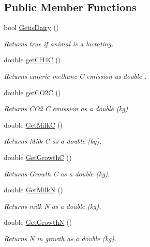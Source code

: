 \subsection*{Public Member Functions}
\begin{DoxyCompactItemize}
\item 
bool \mbox{\hyperlink{classlivestock_a1c4aab24ce56140e9c81ea03037c7f61}{Getis\+Dairy}} ()
\begin{DoxyCompactList}\small\item\em Returns true if animal is a lactating. \end{DoxyCompactList}\item 
double \mbox{\hyperlink{classlivestock_a8dc55a0cba9604b37b2e458dd4754966}{get\+C\+H4C}} ()
\begin{DoxyCompactList}\small\item\em Returns enteric methane C emission as double . \end{DoxyCompactList}\item 
double \mbox{\hyperlink{classlivestock_a20a18f7a7c6e04d1f851eccf01cefb25}{get\+C\+O2C}} ()
\begin{DoxyCompactList}\small\item\em Returns C\+O2 C emission as a double (kg). \end{DoxyCompactList}\item 
double \mbox{\hyperlink{classlivestock_a2d1f6bb0b58f669ccebb29a642221688}{Get\+MilkC}} ()
\begin{DoxyCompactList}\small\item\em Returns Milk C as a double (kg). \end{DoxyCompactList}\item 
double \mbox{\hyperlink{classlivestock_a97877b7ae61e64a6f2d38d4f23fcec6f}{Get\+GrowthC}} ()
\begin{DoxyCompactList}\small\item\em Returns Growth C as a double (kg). \end{DoxyCompactList}\item 
double \mbox{\hyperlink{classlivestock_a8141a1b0547d065a4eef1878aab12396}{Get\+MilkN}} ()
\begin{DoxyCompactList}\small\item\em Returns milk N as a double (kg). \end{DoxyCompactList}\item 
double \mbox{\hyperlink{classlivestock_a658e5f0abf42c7fa7526c977c42e1e55}{Get\+GrowthN}} ()
\begin{DoxyCompactList}\small\item\em Returns N in growth as a double (kg). \end{DoxyCompactList}\item 

\end{DoxyCompactItemize}
